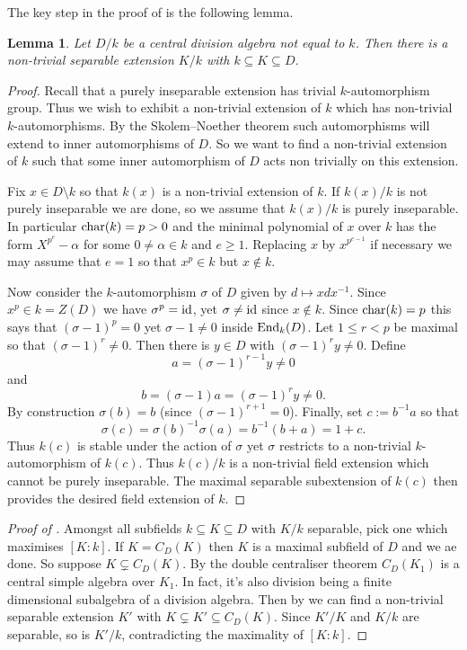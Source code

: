 \documentclass[11pt]{amsart}
\numberwithin{equation}{section}
\newtheorem{lemma}[equation]{Lemma}
\theoremstyle{remark}
\theoremstyle{remark}
\theoremstyle{remark}
\theoremstyle{definition}
\theoremstyle{definition}
\theoremstyle{definition}
\theoremstyle{definition}
\theoremstyle{definition}
\theoremstyle{definition}
\begin{document}
The key step in the proof of  is the following lemma.

\begin{lemma} \label{sep subfield}
Let $D/k$ be a central division algebra not equal to $k$. Then there is a non-trivial separable extension $K/k$ with $k\subseteq K\subseteq D$. 
\end{lemma}

\begin{proof}
Recall that a purely inseparable extension has trivial $k$-automorphism group. Thus we wish to exhibit a non-trivial extension of $k$ which has non-trivial $k$-automorphisms. By the Skolem--Noether theorem such automorphisms will extend to inner automorphisms of $D$. So we want to find a non-trivial extension of $k$ such that some inner automorphism of $D$ acts non trivially on this extension.

Fix $x\in D\setminus k$ so that $k(x)$ is a non-trivial extension of $k$. If $k(x)/k$ is not purely inseparable we are done, so we assume that $k(x)/k$ is purely inseparable. In particular $\textup{char}(k)=p>0$ and the minimal polynomial of $x$ over $k$ has the form $X^{p^e}-\alpha$ for some $0\neq \alpha \in k$ and $e\geq 1$. Replacing $x$ by $x^{p^{e-1}}$ if necessary we may assume that $e=1$ so that $x^p\in k$ but $x\notin k$. 

Now consider the $k$-automorphism $\sigma$ of $D$ given by $d\mapsto xdx^{-1}$. Since $x^p\in k=Z(D)$ we have $\sigma^p=\textup{id}$, yet $\sigma \neq \textup{id}$ since $x\notin k$. Since $\textup{char}(k)=p$ this says that $(\sigma-1)^p=0$ yet $\sigma-1\neq 0$ inside $\textup{End}_k(D)$. Let $1\leq r<p$ be maximal so that $(\sigma-1)^r\neq0$. Then there is $y\in D$ with $(\sigma-1)^ry\neq 0$. Define 
\[a=(\sigma-1)^{r-1}y\neq 0\]
and 
\[b=(\sigma-1)a=(\sigma-1)^ry\neq 0.\]
By construction $\sigma(b)=b$ (since $(\sigma-1)^{r+1}=0$). Finally, set $c:=b^{-1}a$ so that
\[\sigma(c)=\sigma(b)^{-1}\sigma(a)=b^{-1}(b+a)=1+c.\]
Thus $k(c)$ is stable under the action of $\sigma$ yet $\sigma$ restricts to a non-trivial $k$-automorphism of $k(c)$. Thus $k(c)/k$ is a non-trivial field extension which cannot be purely inseparable. The maximal separable subextension of $k(c)$ then provides the desired field extension of $k$.
\end{proof}

\begin{proof}[Proof of ]
Amongst all subfields $k\subseteq K\subseteq D$ with $K/k$ separable, pick one which maximises $[K:k]$. If $K=C_D(K)$ then $K$ is a maximal subfield of $D$ and we ae done. So suppose $K\subsetneq C_D(K)$. By the double centraliser theorem $C_D(K_1)$ is a central simple algebra over $K_1$. In fact, it's also division being a finite dimensional subalgebra of a division algebra. Then by  we can find a non-trivial separable extension $K'$ with $K\subsetneq K'\subseteq C_D(K)$. Since $K'/K$ and $K/k$ are separable, so is $K'/k$, contradicting the maximality of $[K:k]$. 
\end{proof}
\end{document}
